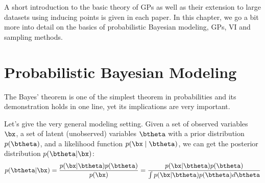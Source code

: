 


\graphicspath{{2/figures/}}

A short introduction to the basic theory of \acl{GPs} as well as their extension to large datasets using inducing points \cite{Titsias2009} is given in each paper.
In this chapter, we go a bit more into detail on the basics of probabilistic Bayesian modeling, \acl{GPs}, \acl{VI} and sampling methods.


\section{Probabilistic Bayesian Modeling}

\label{sec:prob_bayes}

The Bayes' theorem is one of the simplest theorem in probabilities and its demonstration holds in one line, yet its implications are very important.

Let's give the very general modeling setting.
Given a set of observed variables $\bx$, a set of latent (unobserved) variables $\btheta$ with a prior distribution $p(\btheta)$, and a likelihood function $p(\bx\mid\btheta)$, we can get the posterior distribution $p(\btheta|\bx)$:
\begin{align}
p(\btheta|\bx) = \frac{p(\bx|\btheta)p(\btheta)}{p(\bx)} = \frac{p(\bx|\btheta)p(\btheta)}{\int p(\bx|\btheta)p(\btheta)d\btheta}
\label{eq:bayes}
\end{align}

